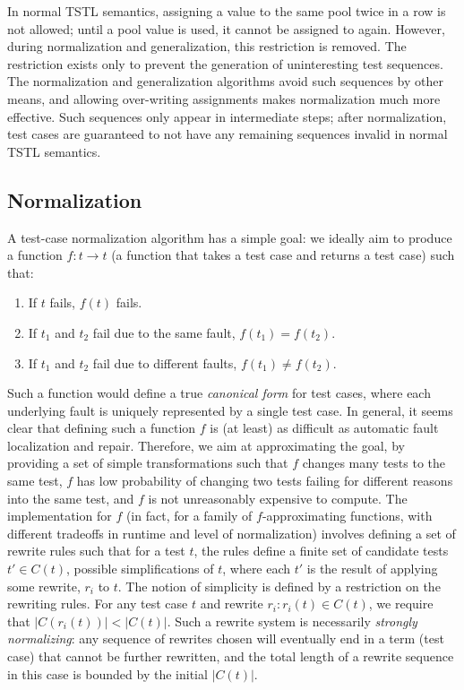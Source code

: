In normal TSTL semantics, assigning a
value to the same pool twice in a row is not allowed; until a pool
value is used, it cannot be assigned to again.  However, during
normalization and generalization, this restriction is removed.  The
restriction exists only to prevent the generation of uninteresting
test sequences.  The normalization and generalization algorithms avoid
such sequences by other means, and allowing over-writing assignments
makes normalization much more effective.  Such sequences only appear
in intermediate steps; after normalization, test
cases are guaranteed to not have any remaining sequences invalid in
normal TSTL semantics.

\subsection{Normalization}

A test-case normalization algorithm has a simple goal:  we ideally aim to
produce a function $f : t \rightarrow t$ (a function that takes a test
case and returns a test case) such that:

\begin{enumerate}
\item If $t$ fails, $f(t)$ fails.
\item If $t_1$ and $t_2$ fail due to the same fault, $f(t_1) = f(t_2)$.
\item If $t_1$ and $t_2$ fail due to different faults, $f(t_1) \not=
  f(t_2)$.
\end{enumerate}

Such a function would define a true \emph{canonical form} for test
cases, where each underlying fault is uniquely represented by a single
test case.  In general, it seems clear that defining such a function
$f$ is (at least) as difficult as automatic fault localization and
repair.  Therefore, we aim at approximating the goal, by providing a
set of simple transformations such that $f$ changes many tests to the
same test, $f$ has low probability of changing two tests failing for
different reasons into the same test, and $f$ is not unreasonably
expensive to compute.  The implementation for $f$ (in fact, for a
family of $f$-approximating functions, with different tradeoffs in
runtime and level of normalization) involves defining a set of rewrite
rules such that for a test $t$, the rules define a
finite set of candidate tests $t' \in C(t)$, possible simplifications
of $t$, where each $t'$ is the result of applying some rewrite, $r_i$
to $t$.  The notion of simplicity is defined by a restriction on the
rewriting rules.  For any test case $t$ and rewrite $r_i : r_i(t) \in C(t)$, we
require that $|C(r_i(t))| < |C(t)|$.  Such a rewrite system is
necessarily \emph{strongly normalizing}: any sequence of rewrites
chosen will eventually end in a term (test case) that cannot be
further rewritten, and the total length of a rewrite sequence in this
case is bounded by the initial $|C(t)|$.

